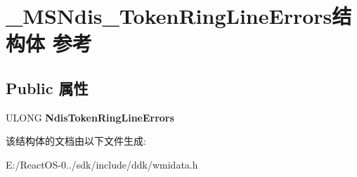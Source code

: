 \hypertarget{struct___m_s_ndis___token_ring_line_errors}{}\section{\+\_\+\+M\+S\+Ndis\+\_\+\+Token\+Ring\+Line\+Errors结构体 参考}
\label{struct___m_s_ndis___token_ring_line_errors}
\subsection*{Public 属性}
\begin{DoxyCompactItemize}
\item 
\mbox{\label{struct___m_s_ndis___token_ring_line_errors_adcd7f5be557bb4cf917aa9d29f3a9d35}} 
U\+L\+O\+NG {\bfseries Ndis\+Token\+Ring\+Line\+Errors}
\end{DoxyCompactItemize}


该结构体的文档由以下文件生成\+:\begin{DoxyCompactItemize}
\item 
E\+:/\+React\+O\+S-\/0../sdk/include/ddk/wmidata.\+h\end{DoxyCompactItemize}
